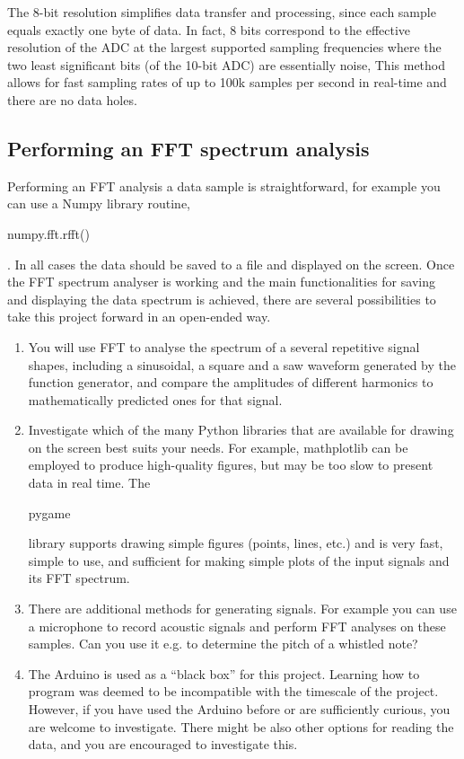\begin{enumerate}


 The 8-bit resolution simplifies data transfer and processing, since each sample equals exactly one byte of data. In fact, 8 bits correspond to the effective resolution of the ADC at the largest supported sampling frequencies where the two least significant bits (of the 10-bit ADC) are essentially noise,
This method allows for fast sampling rates of up to 100k samples per second in real-time and there are no data holes.
\end{enumerate}

\subsection{Performing an FFT spectrum analysis}

Performing an FFT analysis a data sample is straightforward, for example you can use a Numpy library routine, \begin{tt}numpy.fft.rfft()\end{tt}. In all cases the data should be saved to a file and displayed on the screen.  Once the FFT spectrum analyser is working and the main functionalities for saving and displaying the data spectrum is achieved, there are several possibilities to take this project forward in an open-ended way. 

\begin{enumerate}

\item	You will use FFT to analyse the spectrum of a several repetitive signal shapes, including a sinusoidal, a square and a saw waveform generated by the function generator, and compare the amplitudes of different harmonics to mathematically predicted ones for that signal.

\item Investigate which of the many Python libraries that are available for drawing on the screen best suits your needs. For example, mathplotlib can be employed to produce high-quality figures, but may be too slow to present data in real time. The \begin{tt}pygame\end{tt} library supports drawing simple figures (points, lines, etc.) and is very fast, simple to use, and sufficient for making simple plots of the input signals and its FFT spectrum.

\item There are additional methods for generating signals. For example you can use a microphone to record acoustic signals and perform FFT analyses on these samples. Can you use it e.g. to determine the pitch of a whistled note?

\item The Arduino is used as a ``black box'' for this project. Learning how to program was deemed to be incompatible with the timescale of the project. However, if you have used the Arduino before or are sufficiently curious, you are welcome to investigate. There might be also other options for reading the data, and you are encouraged to investigate this.

\end{enumerate}

